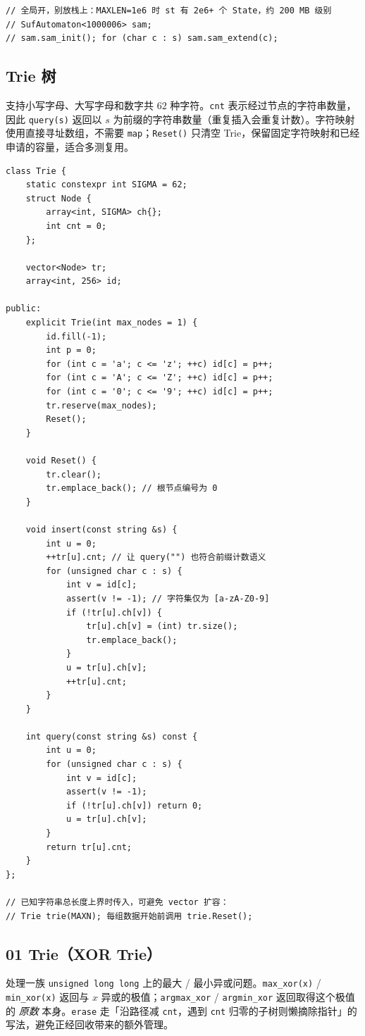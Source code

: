 \begin{multicols*}{2}
\begin{verbatim}
// 全局开，别放栈上：MAXLEN=1e6 时 st 有 2e6+ 个 State，约 200 MB 级别
// SufAutomaton<1000006> sam;
// sam.sam_init(); for (char c : s) sam.sam_extend(c);
		\end{verbatim}

		\subsection{Trie 树}

		支持小写字母、大写字母和数字共 $62$ 种字符。\verb|cnt| 表示经过节点的字符串数量，因此 \verb|query(s)| 返回以 $s$ 为前缀的字符串数量（重复插入会重复计数）。字符映射使用直接寻址数组，不需要 \verb|map|；\verb|Reset()| 只清空 Trie，保留固定字符映射和已经申请的容量，适合多测复用。

		\begin{verbatim}
class Trie {
	static constexpr int SIGMA = 62;
	struct Node {
		array<int, SIGMA> ch{};
		int cnt = 0;
	};

	vector<Node> tr;
	array<int, 256> id;

public:
	explicit Trie(int max_nodes = 1) {
		id.fill(-1);
		int p = 0;
		for (int c = 'a'; c <= 'z'; ++c) id[c] = p++;
		for (int c = 'A'; c <= 'Z'; ++c) id[c] = p++;
		for (int c = '0'; c <= '9'; ++c) id[c] = p++;
		tr.reserve(max_nodes);
		Reset();
	}

	void Reset() {
		tr.clear();
		tr.emplace_back(); // 根节点编号为 0
	}

	void insert(const string &s) {
		int u = 0;
		++tr[u].cnt; // 让 query("") 也符合前缀计数语义
		for (unsigned char c : s) {
			int v = id[c];
			assert(v != -1); // 字符集仅为 [a-zA-Z0-9]
			if (!tr[u].ch[v]) {
				tr[u].ch[v] = (int) tr.size();
				tr.emplace_back();
			}
			u = tr[u].ch[v];
			++tr[u].cnt;
		}
	}

	int query(const string &s) const {
		int u = 0;
		for (unsigned char c : s) {
			int v = id[c];
			assert(v != -1);
			if (!tr[u].ch[v]) return 0;
			u = tr[u].ch[v];
		}
		return tr[u].cnt;
	}
};

// 已知字符串总长度上界时传入，可避免 vector 扩容：
// Trie trie(MAXN); 每组数据开始前调用 trie.Reset();
		\end{verbatim}

		\subsection{01 Trie（XOR Trie）}

		处理一族 \verb|unsigned long long| 上的最大 / 最小异或问题。\verb|max_xor(x)| / \verb|min_xor(x)| 返回与 $x$ 异或的极值；\verb|argmax_xor| / \verb|argmin_xor| 返回取得这个极值的 \emph{原数} 本身。\verb|erase| 走「沿路径减 \verb|cnt|，遇到 \verb|cnt| 归零的子树则懒摘除指针」的写法，避免正经回收带来的额外管理。


\end{multicols*}
